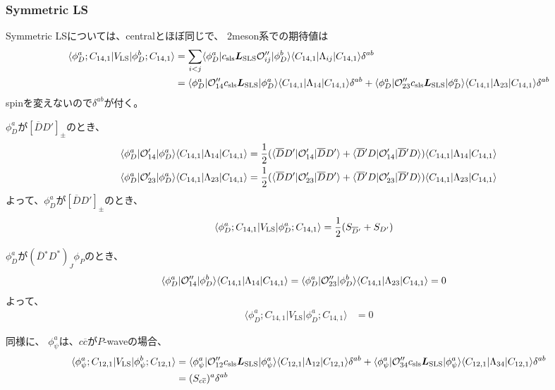\documentclass[a4j]{jarticle}
\def\bra{\langle}
\def\ket{\rangle}
\def\calO{{\cal O}}
\def\cbar{\overline{{c}}}
\def\Dbar{\overline{{D}}{}}
\newcommand{\xbld}[1]{\mbox{\boldmath $#1$}}
\def\vecL{{\xbld{L}}}
\def\half#1{\text{${#1\over 2}$}}
\def\Vls{V_\text{LS}}
\def\Lsls{{\vecL_\text{SLS}}}
\begin{document}
\subsubsection{Symmetric LS}

Symmetric LSについては、centralとほぼ同じで、
2meson系での期待値は
\begin{align}
\bra \phi_D^a;C_{14,1}|\Vls|\phi_D^b;C_{14,1}\ket
&=\sum_{i<j}\bra \phi_D^a|c_\text{sls}\Lsls\calO''_{ij}|\phi_D^b\ket
\bra C_{14,1}|\Lambda_{ij}|C_{14,1}\ket\delta^{ab}
\\
&=\bra \phi_D^a|\calO''_{14}c_\text{sls}\Lsls|\phi_D^a\ket\bra C_{14,1}|\Lambda_{14}|C_{14,1}\ket\delta^{ab}
 +\bra \phi_D^a|\calO''_{23}c_\text{sls}\Lsls|\phi_D^a\ket\bra C_{14,1}|\Lambda_{23}|C_{14,1}\ket\delta^{ab}
\end{align}
spinを変えないので$\delta^{ab}$が付く。

$\phi_D^a$が$[\Dbar D']_\pm$のとき、
\begin{align}
\bra \phi_D^a|\calO'_{14}|\phi_D^a\ket\bra C_{14,1}|\Lambda_{14}|C_{14,1}\ket
&=\half1
(\bra \Dbar D'|\calO'_{14}|\Dbar D'\ket+\bra \Dbar' D|\calO'_{14}|\Dbar' D\ket)\bra C_{14,1}|\Lambda_{14}|C_{14,1}\ket
\\
\bra \phi_D^a|\calO'_{23}|\phi_D^a\ket\bra C_{14,1}|\Lambda_{23}|C_{14,1}\ket
&=\half1
(\bra \Dbar D'|\calO'_{23}|\Dbar D'\ket+\bra \Dbar' D|\calO'_{23}|\Dbar' D\ket)\bra C_{14,1}|\Lambda_{23}|C_{14,1}\ket
\end{align}
よって、$\phi_D^a$が$[\Dbar D']_\pm$のとき、
\begin{align}
\bra \phi_D^a;C_{14,1}|\Vls|\phi_D^a;C_{14,1}\ket
&=\half1 (S_{\Dbar'}+S_{D'})
\end{align}

$\phi_D^a$が$(\Dbar^* D^*)_J\phi_P$のとき、
\begin{align}
\bra \phi_D^a|\calO''_{14}|\phi_D^b\ket\bra C_{14,1}|\Lambda_{14}|C_{14,1}\ket
&=\bra \phi_D^a|\calO''_{23}|\phi_D^b\ket\bra C_{14,1}|\Lambda_{23}|C_{14,1}\ket
=0
\end{align}
よって、\begin{align}
\bra \phi_D^a;C_{14,1}|\Vls|\phi_D^a;C_{14,1}\ket
&=0
\end{align}

同様に、
$\phi_\psi^a$は、$c\cbar$が$P$-waveの場合、
\begin{align}
\bra \phi_\psi^a;C_{12,1}|\Vls|\phi_\psi^b;C_{12,1}\ket
&=\bra \phi_\psi^a|\calO''_{12}c_\text{sls}\Lsls|\phi_\psi^a\ket\bra C_{12,1}|\Lambda_{12}|C_{12,1}\ket\delta^{ab}
 +\bra \phi_\psi^a|\calO''_{34}c_\text{sls}\Lsls|\phi_\psi^a\ket\bra C_{12,1}|\Lambda_{34}|C_{12,1}\ket\delta^{ab}
\nonumber\\
&=(S_{c\cbar})^a\delta^{ab}
\end{align}
\end{document}

